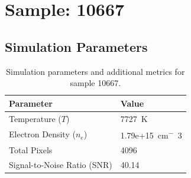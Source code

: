 \documentclass[a4paper,11pt]{article}
\begin{document}
\clearpage

\section{Sample: 10667}
\subsection{Simulation Parameters}
\begin{table}[h!]
    \centering
    \begin{tabular}{ll}
        \toprule
        \textbf{Parameter} & \textbf{Value} \\
        \midrule
        Temperature ($T$) & 7727 \,\si{K} \\
        Electron Density ($n_e$) & 1.79e+15 \,\si{cm^-3} \\
        Total Pixels & 4096 \\
        Signal-to-Noise Ratio (SNR) & 40.14 \\
        \bottomrule
    \end{tabular}
    \caption{Simulation parameters and additional metrics for sample 10667.}
    \label{tab:params_10667}
\end{table}
\end{document}
